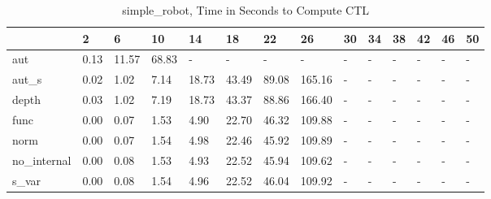 \begin{table}
\caption{simple_robot, Time in Seconds to Compute CTL}
\label{simple_robot_CTL_time}
\begin{tabular}{llllllllllllll}
\toprule
 & 2 & 6 & 10 & 14 & 18 & 22 & 26 & 30 & 34 & 38 & 42 & 46 & 50 \\
\midrule
aut & 0.13 & 11.57 & 68.83 & - & - & - & - & - & - & - & - & - & - \\
aut_s & 0.02 & 1.02 & 7.14 & 18.73 & 43.49 & 89.08 & 165.16 & - & - & - & - & - & - \\
depth & 0.03 & 1.02 & 7.19 & 18.73 & 43.37 & 88.86 & 166.40 & - & - & - & - & - & - \\
func & 0.00 & 0.07 & 1.53 & 4.90 & 22.70 & 46.32 & 109.88 & - & - & - & - & - & - \\
norm & 0.00 & 0.07 & 1.54 & 4.98 & 22.46 & 45.92 & 109.89 & - & - & - & - & - & - \\
no_internal & 0.00 & 0.08 & 1.53 & 4.93 & 22.52 & 45.94 & 109.62 & - & - & - & - & - & - \\
s_var & 0.00 & 0.08 & 1.54 & 4.96 & 22.52 & 46.04 & 109.92 & - & - & - & - & - & - \\
\bottomrule
\end{tabular}
\end{table}
